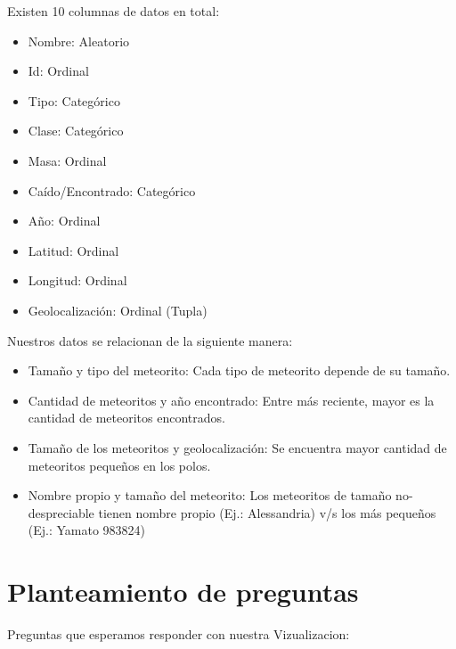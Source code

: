 \documentclass[letterpaper,10pt]{article}
\begin{document}
	Existen 10 columnas de datos en total:

	\begin{itemize}
		\item Nombre: Aleatorio
		\item Id: Ordinal
		\item Tipo: Categórico
		\item Clase: Categórico
		\item Masa: Ordinal

		\item Caído/Encontrado: Categórico
		\item Año: Ordinal
		\item Latitud: Ordinal
		\item Longitud: Ordinal
		\item Geolocalización: Ordinal (Tupla)
	\end{itemize}

	Nuestros datos se relacionan de la siguiente manera:

	\begin{itemize}
		\item Tamaño y tipo del meteorito: Cada tipo de meteorito depende de su tamaño.
		\item Cantidad de meteoritos y año encontrado: Entre más reciente, mayor es la cantidad de meteoritos encontrados.
		\item Tamaño de los meteoritos y geolocalización: Se encuentra mayor cantidad de meteoritos pequeños en los polos.
		\item Nombre propio y tamaño del meteorito: Los meteoritos de tamaño no-despreciable tienen nombre propio (Ej.: Alessandria) v/s los más pequeños (Ej.: Yamato 983824)
	\end{itemize}

	\newpage

	\section{Planteamiento de preguntas}
	
	
	Preguntas que esperamos responder con nuestra Vizualizacion:
	
\end{document}
